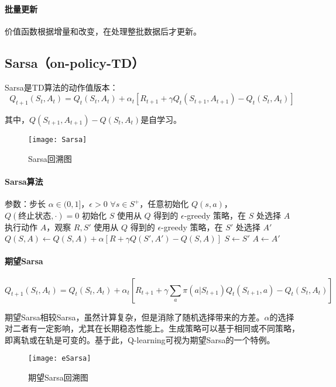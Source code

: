 \documentclass[
12pt, %
a4paper, 
oneside, %
headinclude,footinclude, %
]{scrartcl}
\begin{document}
\paragraph{批量更新}
价值函数根据增量和改变，在处理整批数据后才更新。
\subsection{Sarsa（on-policy-TD）}
Sarsa是TD算法的动作值版本：
$$
Q_{t + 1}(S_t, A_t) = Q_t(S_t, A_t) + \alpha_t[R_{t + 1} + \gamma Q_t(S_{t + 1}, A_{t + 1}) - Q_t(S_t, A_t)]
$$

其中，$ Q(S_{t + 1}, A_{t + 1}) - Q(S_t, A_t) $是自学习。

\begin{figure}[H]
\centering
\texttt{[image: Sarsa]}
\caption[Sarsa回溯图]{Sarsa回溯图}
\end{figure}
\paragraph{Sarsa算法}
\begin{myalgorithm}[Sarsa算法]
\State 参数：步长 $\alpha \in (0,1]$，$\epsilon > 0$
\State $\forall s \in S^+$，任意初始化 $Q(s,a)$，$Q(\text{终止状态},\cdot) = 0$
    \State 初始化 $S$
    \State 使用从 $Q$ 得到的 $\epsilon$-greedy 策略，在 $S$ 处选择 $A$
        \State 执行动作 $A$，观察 $R,S'$
        \State 使用从 $Q$ 得到的 $\epsilon$-greedy 策略，在 $S'$ 处选择 $A'$
        \State $Q(S, A) \gets Q(S, A) + \alpha [R + \gamma Q(S', A') - Q(S, A)]$
        \State $S \gets S'$
        \State $A \gets A'$
    \EndWhile
\EndFor
\end{myalgorithm}
\paragraph{期望Sarsa}
$$
Q_{t + 1}(S_t, A_t) = Q_t(S_t, A_t) + \alpha_t[R_{t + 1} + \gamma \sum_a \pi(a|S_{t + 1}) Q_t(S_{t + 1}, a) - Q_t(S_t, A_t)]
$$

期望Sarsa相较Sarsa，虽然计算复杂，但是消除了随机选择带来的方差。$ \alpha $的选择对二者有一定影响，尤其在长期稳态性能上。生成策略可以基于相同或不同策略，即离轨或在轨是可变的。基于此，Q-learning可视为期望Sarsa的一个特例。
\begin{figure}[H]
\centering
\texttt{[image: eSarsa]}
\caption[期望Sarsa回溯图]{期望Sarsa回溯图}
\end{figure}
\end{document}
